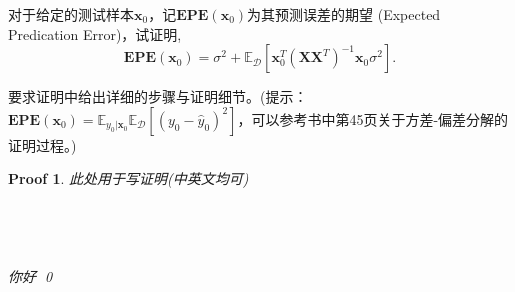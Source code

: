 \documentclass[a4paper,UTF8]{article}
\numberwithin{equation}{section}
\newtheorem*{myProof}{Proof}
\begin{document}
对于给定的测试样本$\textbf{x}_0$，记$\mathbf{EPE}(\textbf{x}_0)$为其预测误差的期望 (Expected Predication Error)，试证明,
\[
	\mathbf{EPE}(\textbf{x}_0) = \sigma^2+\mathbb{E}_{\mathcal{D}}[\textbf{x}_0^T(\textbf{X}\textbf{X}^T)^{-1}\textbf{x}_0\sigma^2].
\]

要求证明中给出详细的步骤与证明细节。(提示：$\mathbf{EPE}(\textbf{x}_0)=\mathbb{E}_{y_0|\textbf{x}_0} \mathbb{E}_{\mathcal{D}}[(y_0-\hat{y}_0)^2]$，可以参考书中第45页关于方差-偏差分解的证明过程。)

\begin{myProof}
此处用于写证明(中英文均可)
~\\
~\\
~\\
~\\
~\\

你好
\qed
\end{myProof}
\end{document}
